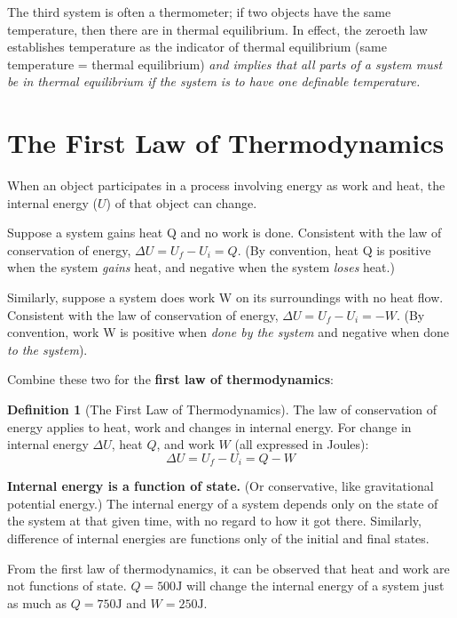 \documentclass[12pt, a4paper]{article}
\theoremstyle{definition}
\newtheorem{definition}{Definition}
\begin{document}
The third system is often a thermometer; if two objects have the same temperature, then there are in thermal equilibrium.
In effect, the zeroeth law establishes temperature as the indicator of thermal equilibrium (same temperature = thermal equilibrium)
\textit{and implies that all parts of a system must be in thermal equilibrium if the system is to have one definable temperature.}

\section{The First Law of Thermodynamics}

When an object participates in a process involving energy as work and heat, the internal energy ($U$) of that object can change.

Suppose a system gains heat Q and no work is done.
Consistent with the law of conservation of energy, $\Delta U = U_f - U_i = Q$.
(By convention, heat Q is positive when the system \textit{gains} heat, and negative when the system \textit{loses} heat.)

Similarly, suppose a system does work W on its surroundings with no heat flow.
Consistent with the law of conservation of energy, $\Delta U = U_f - U_i = -W$.
(By convention, work W is positive when \textit{done by the system} and negative when done \textit{to the system}).

Combine these two for the \textbf{first law of thermodynamics}:

\begin{definition}[The First Law of Thermodynamics]
    The law of conservation of energy applies to heat, work and changes in internal energy.
    For change in internal energy $\Delta U$, heat $Q$, and work $W$ (all expressed in Joules):
    \[\Delta U = U_f - U_i = Q - W\]
\end{definition}

\textbf{Internal energy is a function of state.} (Or conservative, like gravitational potential energy.) 
The internal energy of a system depends only on the state of the system at that given time, with no regard to how it got there.
Similarly, difference of internal energies are functions only of the initial and final states.

From the first law of thermodynamics, it can be observed that heat and work are not functions of state.
$Q = 500\textrm{J}$ will change the internal energy of a system just as much as $Q = 750\textrm{J}$ and $W = 250\textrm{J}$.
\end{document}
